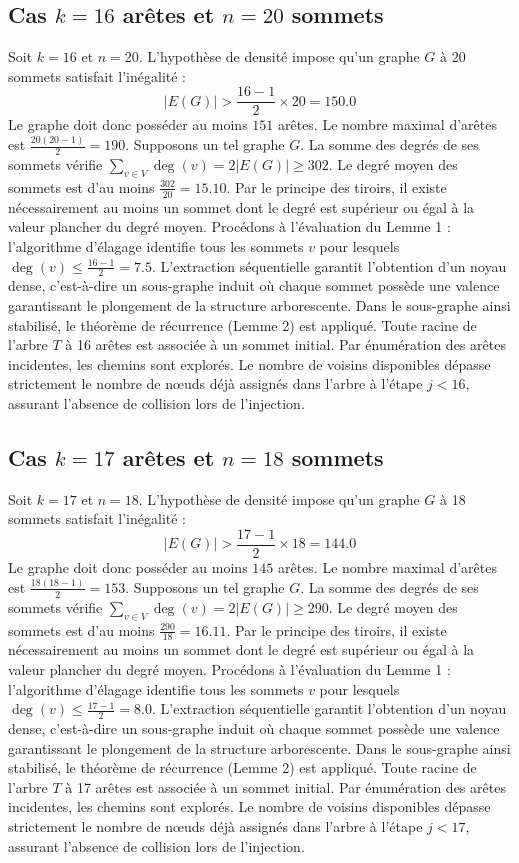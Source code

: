 \documentclass[12pt,a4paper]{article}
\begin{document}
\subsection{Cas $k = 16$ arêtes et $n = 20$ sommets}
Soit $k = 16$ et $n = 20$. L'hypothèse de densité impose qu'un graphe $G$ à 20 sommets satisfait l'inégalité :
$$ |E(G)| > \frac{16-1}{2} \times 20 = 150.0 $$
Le graphe doit donc posséder au moins $151$ arêtes. Le nombre maximal d'arêtes est $\frac{20(20-1)}{2} = 190$.
Supposons un tel graphe $G$. La somme des degrés de ses sommets vérifie $\sum_{v \in V} \deg(v) = 2|E(G)| \geq 302$.
Le degré moyen des sommets est d'au moins $\frac{302}{20} = 15.10$.
Par le principe des tiroirs, il existe nécessairement au moins un sommet dont le degré est supérieur ou égal à la valeur plancher du degré moyen.
Procédons à l'évaluation du Lemme 1 : l'algorithme d'élagage identifie tous les sommets $v$ pour lesquels $\deg(v) \leq \frac{16-1}{2} = 7.5$.
L'extraction séquentielle garantit l'obtention d'un noyau dense, c'est-à-dire un sous-graphe induit où chaque sommet possède une valence garantissant le plongement de la structure arborescente.
Dans le sous-graphe ainsi stabilisé, le théorème de récurrence (Lemme 2) est appliqué. Toute racine de l'arbre $T$ à 16 arêtes est associée à un sommet initial. Par énumération des arêtes incidentes, les chemins sont explorés. Le nombre de voisins disponibles dépasse strictement le nombre de nœuds déjà assignés dans l'arbre à l'étape $j < 16$, assurant l'absence de collision lors de l'injection.

\subsection{Cas $k = 17$ arêtes et $n = 18$ sommets}
Soit $k = 17$ et $n = 18$. L'hypothèse de densité impose qu'un graphe $G$ à 18 sommets satisfait l'inégalité :
$$ |E(G)| > \frac{17-1}{2} \times 18 = 144.0 $$
Le graphe doit donc posséder au moins $145$ arêtes. Le nombre maximal d'arêtes est $\frac{18(18-1)}{2} = 153$.
Supposons un tel graphe $G$. La somme des degrés de ses sommets vérifie $\sum_{v \in V} \deg(v) = 2|E(G)| \geq 290$.
Le degré moyen des sommets est d'au moins $\frac{290}{18} = 16.11$.
Par le principe des tiroirs, il existe nécessairement au moins un sommet dont le degré est supérieur ou égal à la valeur plancher du degré moyen.
Procédons à l'évaluation du Lemme 1 : l'algorithme d'élagage identifie tous les sommets $v$ pour lesquels $\deg(v) \leq \frac{17-1}{2} = 8.0$.
L'extraction séquentielle garantit l'obtention d'un noyau dense, c'est-à-dire un sous-graphe induit où chaque sommet possède une valence garantissant le plongement de la structure arborescente.
Dans le sous-graphe ainsi stabilisé, le théorème de récurrence (Lemme 2) est appliqué. Toute racine de l'arbre $T$ à 17 arêtes est associée à un sommet initial. Par énumération des arêtes incidentes, les chemins sont explorés. Le nombre de voisins disponibles dépasse strictement le nombre de nœuds déjà assignés dans l'arbre à l'étape $j < 17$, assurant l'absence de collision lors de l'injection.
\end{document}

